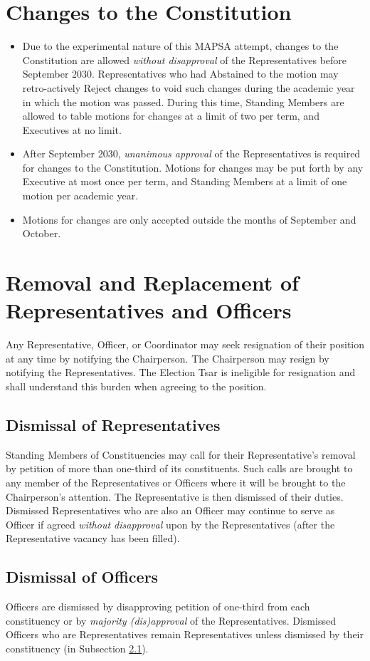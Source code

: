 \documentclass[8pt]{article}
\begin{document}
	\section{Changes to the Constitution}
	\begin{itemize}
		\item Due to the experimental nature of this MAPSA attempt, changes to the Constitution are allowed \textit{without disapproval} of the Representatives before September 2030. Representatives who had Abstained to the motion may retro-actively Reject changes to void such changes during the academic year in which the motion was passed. During this time, Standing Members are allowed to table motions for changes at a limit of two per term, and Executives at no limit. 
		\item After September 2030, \textit{unanimous approval} of the Representatives is required for changes to the Constitution. Motions for changes may be put forth by any Executive at most once per term, and Standing Members at a limit of one motion per academic year.
		\item Motions for changes are only accepted outside the months of September and October.
	\end{itemize}	
	\section{Removal and Replacement of Representatives and Officers}\label{sec:dismisssss}
	Any Representative, Officer, or Coordinator may seek resignation of their position at any time by notifying the Chairperson. The Chairperson may resign by notifying the Representatives. The Election Tsar is ineligible for resignation and shall understand this burden when agreeing to the position.
	\subsection{Dismissal of Representatives}\label{subsec:dismis} Standing Members of Constituencies may call for their Representative's removal by petition of more than one-third of its constituents. Such calls are brought to any member of the Representatives or Officers where it will be brought to the Chairperson's attention. The Representative is then dismissed of their duties. Dismissed Representatives who are also an Officer may continue to serve as Officer if agreed \textit{without disapproval} upon by the Representatives (after the Representative vacancy has been filled).
	\subsection{Dismissal of Officers} Officers are dismissed by disapproving petition of one-third from each constituency or by \textit{majority (dis)approval} of the Representatives. Dismissed Officers who are Representatives remain Representatives unless dismissed by their constituency (in Subsection \ref{subsec:dismis}).
\end{document}
